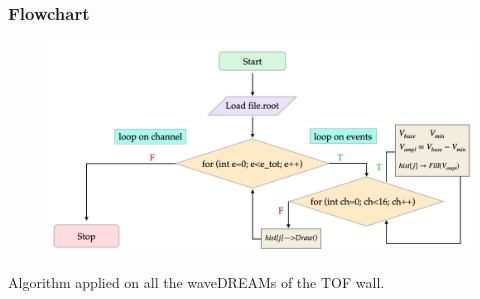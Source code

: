 \begin{frame} [fragile]
    \small
        \frametitle{Flowchart}
                \begin{figure}
             \centering
                \includegraphics[scale=0.25]{figures/flux_diagram.png}
            \end{figure} 
            \begin{block}{}
				Algorithm applied on all the waveDREAMs of the TOF wall.
			\end{block}
    \end{frame}
